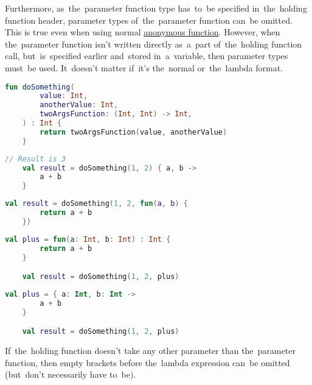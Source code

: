 Furthermore, as~the~parameter function type has~to~be specified in~the~holding function header, parameter types of~the~parameter function can~be omitted.
This is true even when using normal \hyperref[kotlinanonymousfunction]{anonymous function}.
However, when the~parameter function isn't written directly as~a~part of~the~holding function call, but~is~specified earlier and~stored in~a~variable, then parameter types must~be used.
It~doesn't matter if~it's the~normal or~the~lambda format.

\example
\begin{lstlisting}[language=Kotlin, title={Function taking other function as the~last parameter}]
    fun doSomething(
        value: Int,
        anotherValue: Int,
        twoArgsFunction: (Int, Int) -> Int,
    ) : Int {
        return twoArgsFunction(value, anotherValue)
    }
\end{lstlisting}
\begin{lstlisting}[language=Kotlin, title={Usage}]
    // Result is 3
    val result = doSomething(1, 2) { a, b ->
        a + b
    }
\end{lstlisting}
\begin{lstlisting}[language=Kotlin, title={Equivalent with directly written anonymous function -- parameter types not needed}]
    val result = doSomething(1, 2, fun(a, b) {
        return a + b
    })
\end{lstlisting}
\begin{lstlisting}[language=Kotlin, title={Equivalent with anonymous function in a variable -- parameter types must be used}]
    val plus = fun(a: Int, b: Int) : Int {
        return a + b
    }

    val result = doSomething(1, 2, plus)
\end{lstlisting}
\begin{lstlisting}[language=Kotlin, title={Equivalent with lambda function in a variable -- parameter types must be used}]
    val plus = { a: Int, b: Int ->
        a + b
    }

    val result = doSomething(1, 2, plus)
\end{lstlisting}
\newline

\noindent If~the~holding function doesn't take any other parameter than the~parameter function, then empty brackets before the~lambda expression can~be omitted (but~don't necessarily have \mbox{to be).}

